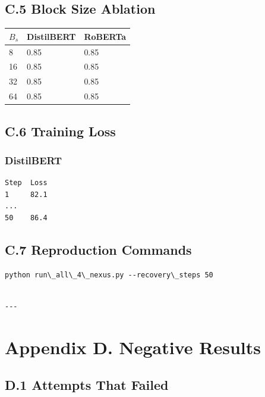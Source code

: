 \subsection{C.5 Block Size Ablation}

\begin{table}[H]
\centering
\small
\begin{tabular}{lll}
\toprule
\textbf{$B_s$} & \textbf{DistilBERT} & \textbf{RoBERTa} \\
\midrule
8 & 0.85 & 0.85 \\
16 & 0.85 & 0.85 \\
32 & 0.85 & 0.85 \\
64 & 0.85 & 0.85 \\
\bottomrule
\end{tabular}
\end{table}

\subsection{C.6 Training Loss}

\subsubsection{DistilBERT}
\begin{lstlisting}
Step  Loss
1     82.1
...
50    86.4
\end{lstlisting}

\subsection{C.7 Reproduction Commands}

\begin{lstlisting}
python run\_all\_4\_nexus.py --recovery\_steps 50
\end{lstlisting}
\begin{lstlisting}

---
\end{lstlisting}

\section{Appendix D. Negative Results}

\subsection{D.1 Attempts That Failed}

